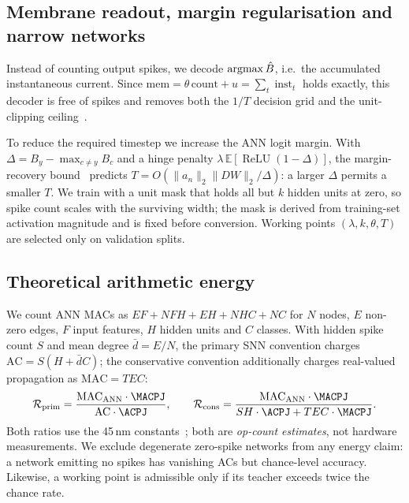 \subsection{Membrane readout, margin regularisation and narrow networks}
\label{ssec:components}

Instead of counting output spikes, we decode $\operatorname{argmax}\hat{B}$, i.e.\ the accumulated instantaneous current. Since $\mathrm{mem}=\theta\,\mathrm{count}+u=\sum_t \operatorname{inst}_t$ holds exactly, this decoder is free of spikes and removes both the $1/T$ decision grid and the unit-clipping ceiling~\cite{dualphase2024}.

To reduce the required timestep we increase the ANN logit margin. With $\Delta = B_{y} - \max_{c\ne y} B_c$ and a hinge penalty $\lambda\,\mathbb{E}[\operatorname{ReLU}(1-\Delta)]$, the margin-recovery bound~\cite{deng2021} predicts $T = O(\|a_n\|_2\|DW\|_2/\Delta)$: a larger $\Delta$ permits a smaller $T$. We train with a unit mask that holds all but $k$ hidden units at zero, so spike count scales with the surviving width; the mask is derived from training-set activation magnitude and is fixed before conversion. Working points $(\lambda, k, \theta, T)$ are selected only on validation splits.

\subsection{Theoretical arithmetic energy}
\label{ssec:energy}

We count ANN MACs as $EF + NFH + EH + NHC + NC$ for $N$ nodes, $E$ non-zero edges, $F$ input features, $H$ hidden units and $C$ classes. With hidden spike count $S$ and mean degree $\bar d = E/N$, the primary SNN convention charges
$\mathrm{AC} = S (H + \bar d C)$;
the conservative convention additionally charges real-valued propagation as $\mathrm{MAC}=T E C$:
\begin{equation}
\mathcal{R}_{\mathrm{prim}} = \frac{\mathrm{MAC}_{\mathrm{ANN}}\cdot\MACPJ}{\mathrm{AC}\cdot\ACPJ},\qquad
\mathcal{R}_{\mathrm{cons}} = \frac{\mathrm{MAC}_{\mathrm{ANN}}\cdot\MACPJ}{S H\cdot\ACPJ + T E C\cdot\MACPJ}.
\label{eq:energy}
\end{equation}
Both ratios use the 45\,nm constants~\cite{horowitz2014}; both are \emph{op-count estimates}, not hardware measurements. We exclude degenerate zero-spike networks from any energy claim: a network emitting no spikes has vanishing ACs but chance-level accuracy. Likewise, a working point is admissible only if its teacher exceeds twice the chance rate.

